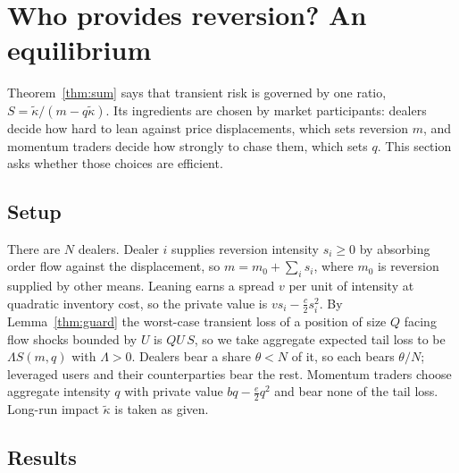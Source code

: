 \documentclass[12pt]{article}
\theoremstyle{definition}
\theoremstyle{remark}
\begin{document}
\section{Who provides reversion? An equilibrium}\label{sec:equil}

Theorem~\ref{thm:sum} says that transient risk is governed by one ratio, $S=\tilde\kappa/(m-q\tilde\kappa)$. Its ingredients are chosen by market participants: dealers decide how hard to lean against price displacements, which sets reversion $m$, and momentum traders decide how strongly to chase them, which sets $q$. This section asks whether those choices are efficient.

\subsection{Setup}
There are $N$ dealers. Dealer $i$ supplies reversion intensity $s_i\ge0$ by absorbing order flow against the displacement, so $m=m_0+\sum_is_i$, where $m_0$ is reversion supplied by other means. Leaning earns a spread $v$ per unit of intensity at quadratic inventory cost, so the private value is $vs_i-\tfrac c2s_i^2$. By Lemma~\ref{thm:guard} the worst-case transient loss of a position of size $Q$ facing flow shocks bounded by $U$ is $QU\,S$, so we take aggregate expected tail loss to be $\Lambda S(m,q)$ with $\Lambda>0$. Dealers bear a share $\theta<N$ of it, so each bears $\theta/N$; leveraged users and their counterparties bear the rest. Momentum traders choose aggregate intensity $q$ with private value $bq-\tfrac e2q^2$ and bear none of the tail loss. Long-run impact $\tilde\kappa$ is taken as given.

\subsection{Results}
\end{document}
